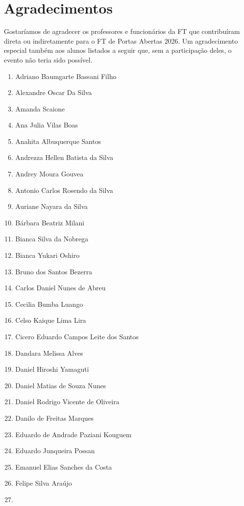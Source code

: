 \documentclass[
  letterpaper,
  DIV=11,
  numbers=noendperiod]{scrreprt}
\providecommand{\tightlist}{%
  \setlength{\itemsep}{0pt}\setlength{\parskip}{0pt}}\usepackage{longtable,booktabs,array}
\begin{document}
\chapter{Agradecimentos}\label{agradecimentos-1}

Gostaríamos de agradecer os professores e funcionários da FT que
contribuíram direta ou indiretamente para o FT de Portas Abertas 2026.
Um agradecimento especial também aos alunos listados a seguir que, sem a
participação deles, o evento não teria sido possível.

\begin{enumerate}
\def\labelenumi{\arabic{enumi}.}
\tightlist
\item
  Adriano Baumgarte Bassani Filho
\item
  Alexandre Oscar Da Silva
\item
  Amanda Scaione
\item
  Ana Julia Vilas Boas
\item
  Anahita Albuquerque Santos
\item
  Andrezza Hellen Batista da Silva
\item
  Andrey Moura Gouvea
\item
  Antonio Carlos Rosendo da Silva
\item
  Auriane Nayara da Silva
\item
  Bárbara Beatriz Milani
\item
  Bianca Silva da Nobrega
\item
  Bianca Yukari Oshiro
\item
  Bruno dos Santos Bezerra
\item
  Carlos Daniel Nunes de Abreu
\item
  Cecilia Bumba Luango
\item
  Celso Kaique Lima Lira
\item
  Cicero Eduardo Campos Leite dos Santos
\item
  Dandara Melissa Alves
\item
  Daniel Hiroshi Yamaguti
\item
  Daniel Matias de Souza Nunes
\item
  Daniel Rodrigo Vicente de Oliveira
\item
  Danilo de Freitas Marques
\item
  Eduardo de Andrade Paziani Kouguem
\item
  Eduardo Junqueira Possan
\item
  Emanuel Elias Sanches da Costa
\item
  Felipe Silva Araújo
\item

\end{enumerate}
\end{document}
